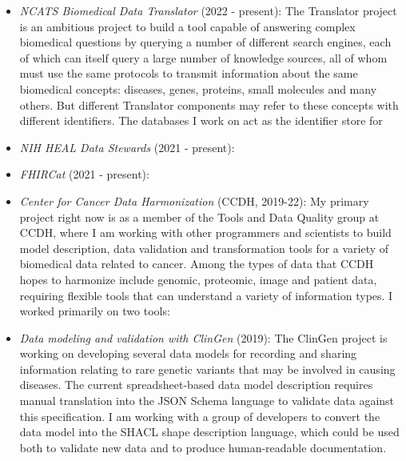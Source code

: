 \begin{itemize}

\item \textit{NCATS Biomedical Data Translator} (2022 - present): The Translator project is an ambitious project to build a tool capable of answering complex biomedical questions by querying a number of different search engines, each of which can itself query a large number of knowledge sources, all of whom must use the same protocols to transmit information about the same biomedical concepts: diseases, genes, proteins, small molecules and many others. But different Translator components may refer to these concepts with different identifiers. The databases I work on act as the identifier store for 

\begin{products}


\end{products}

\item \textit{NIH HEAL Data Stewards} (2021 - present): 

\item \textit{FHIRCat} (2021 - present): 

\item \textit{Center for Cancer Data Harmonization} (CCDH, 2019-22): My primary project right now is as a member of the Tools and Data Quality group at CCDH, where I am working with other programmers and scientists to build model description, data validation and transformation tools for a variety of biomedical data related to cancer. Among the types of data that CCDH hopes to harmonize include genomic, proteomic, image and patient data, requiring flexible tools that can understand a variety of information types. I worked primarily on two tools:

\begin{products}



\end{products}

\item \textit{Data modeling and validation with ClinGen} (2019): The ClinGen project is working on developing several data models for recording and sharing information relating to rare genetic variants that may be involved in causing diseases. The current spreadsheet-based data model description requires manual translation into the JSON Schema language to validate data against this specification. I am working with a group of developers to convert the data model into the SHACL shape description language, which could be used both to validate new data and to produce human-readable documentation.


\end{itemize}
